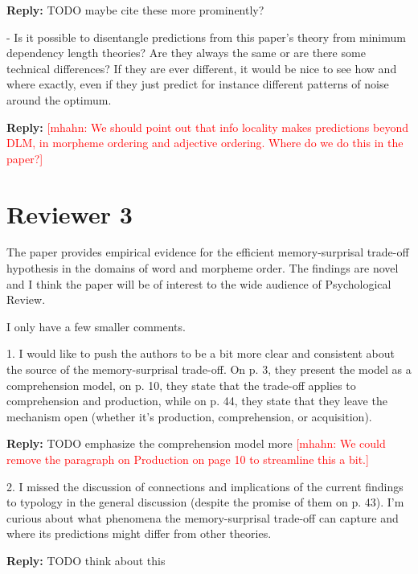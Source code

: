 \documentclass{article}[11pt,a4paper,oneside]
\newcommand\mhahn[1]{\textcolor{red}{[mhahn: #1]}}
\newenvironment{reply}
  {\par\medskip
   \color{blue}%
   \begin{framed}
   \textbf{Reply: }\ignorespaces}
 {\end{framed}
  \medskip}
\begin{document}
\begin{reply}
	TODO maybe cite these more prominently?
\end{reply}

- Is it possible to disentangle predictions from this paper's theory from minimum dependency length theories? Are they always the same or are there some technical differences? If they are ever different, it would be nice to see how and where exactly, even if they just predict for instance different patterns of noise around the optimum.


\begin{reply}
	\mhahn{We should point out that info locality makes predictions beyond DLM, in morpheme ordering and adjective ordering. Where do we do this in the paper?}
\end{reply}



\section{Reviewer 3}

The paper provides empirical evidence for the efficient memory-surprisal trade-off hypothesis in the domains of word and morpheme order. The findings are novel and I think the paper will be of interest to the wide audience of Psychological Review.

I only have a few smaller comments.

1. I would like to push the authors to be a bit more clear and consistent about the source of the memory-surprisal trade-off. On p. 3, they present the model as a comprehension model, on p. 10, they state that the trade-off applies to comprehension and production, while on p. 44, they state that they leave the mechanism open (whether it's production, comprehension, or acquisition).

\begin{reply}
	TODO emphasize the comprehension model more \mhahn{We could remove the paragraph on Production on page 10 to streamline this a bit.}
\end{reply}

2. I missed the discussion of connections and implications of the current findings to typology in the general discussion (despite the promise of them on p. 43). I'm curious about what phenomena the memory-surprisal trade-off can capture and where its predictions might differ from other theories.

\begin{reply}
	TODO think about this
\end{reply}
\end{document}
